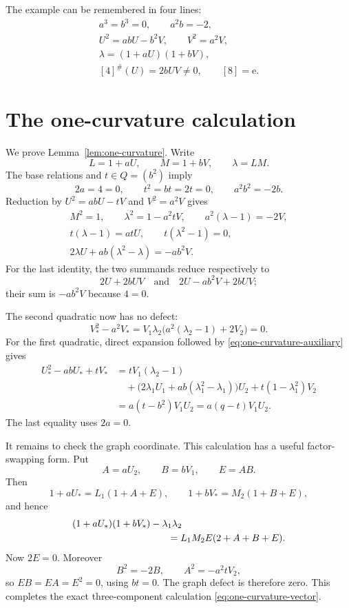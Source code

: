 \documentclass[11pt]{amsart}
\theoremstyle{definition}
\theoremstyle{remark}
\newcommand{\unit}{\mathrm e}
\begin{document}
The example can be remembered in four lines:
\[
 \boxed{
 \begin{gathered}
 a^3=b^3=0,\qquad a^2b=-2,\\
 U^2=abU-b^2V,\qquad V^2=a^2V,\\
 \lambda=(1+aU)(1+bV),\\
 [4]^\#(U)=2bUV\ne0,\qquad [8]=\unit.
 \end{gathered}}
\]

\appendix

\section{The one-curvature calculation}\label{app:one-curvature}

We prove Lemma~\ref{lem:one-curvature}.  Write
\[
 L=1+aU,\qquad M=1+bV,\qquad \lambda=LM.
\]
The base relations and \(t\in Q=(b^2)\) imply
\[
 2a=4=0,\qquad t^2=bt=2t=0,
 \qquad a^2b^2=-2b.
\]
Reduction by \(U^2=abU-tV\) and \(V^2=a^2V\) gives
\begin{equation}\label{eq:one-curvature-auxiliary}
 \begin{gathered}
  M^2=1,\qquad
  \lambda^2=1-a^2tV,\qquad
  a^2(\lambda-1)=-2V,\\
  t(\lambda-1)=atU,\qquad
  t(\lambda^2-1)=0,\\
  2\lambda U+ab(\lambda^2-\lambda)=-ab^2V.
 \end{gathered}
\end{equation}
For the last identity, the two summands reduce respectively to
\[
 2U+2bUV
 \quad\text{and}\quad
 2U-ab^2V+2bUV;
\]
their sum is \(-ab^2V\) because \(4=0\).

The second quadratic now has no defect:
\[
 V_*^2-a^2V_*
 =V_1\lambda_2
   \bigl(a^2(\lambda_2-1)+2V_2\bigr)=0.
\]
For the first quadratic, direct expansion followed by
\eqref{eq:one-curvature-auxiliary} gives
\begin{align*}
 U_*^2-abU_*+tV_*
 &=tV_1(\lambda_2-1)\\
 &\quad+
 \bigl(2\lambda_1U_1+ab(\lambda_1^2-\lambda_1)\bigr)U_2
 +t(1-\lambda_1^2)V_2\\
 &=a(t-b^2)V_1U_2
  =a(q-t)V_1U_2.
\end{align*}
The last equality uses \(2a=0\).

It remains to check the graph coordinate.  This calculation has a useful
factor-swapping form.  Put
\[
 A=aU_2,\qquad B=bV_1,\qquad E=AB.
\]
Then
\[
 1+aU_*=L_1(1+A+E),
 \qquad
 1+bV_*=M_2(1+B+E),
\]
and hence
\begin{align*}
 &(1+aU_*)(1+bV_*)-\lambda_1\lambda_2\\
 &\hspace{35mm}
 =L_1M_2E(2+A+B+E).
\end{align*}
Now \(2E=0\).  Moreover
\[
 B^2=-2B,
 \qquad
 A^2=-a^2tV_2,
\]
so \(EB=EA=E^2=0\), using \(bt=0\).  The graph defect is therefore
zero.  This completes the exact three-component calculation
\eqref{eq:one-curvature-vector}.
\end{document}
